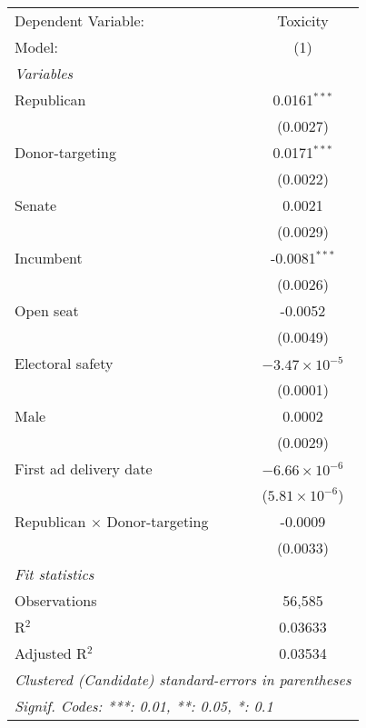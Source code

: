 
\begingroup
\centering
\begin{tabular}{lc}
   \tabularnewline \midrule \midrule
   Dependent Variable:                  & Toxicity\\  
   Model:                               & (1)\\  
   \midrule
   \emph{Variables}\\
   Republican                           & 0.0161$^{***}$\\   
                                        & (0.0027)\\   
   Donor-targeting                      & 0.0171$^{***}$\\   
                                        & (0.0022)\\   
   Senate                               & 0.0021\\   
                                        & (0.0029)\\   
   Incumbent                            & -0.0081$^{***}$\\   
                                        & (0.0026)\\   
   Open seat                            & -0.0052\\   
                                        & (0.0049)\\   
   Electoral safety                     & $-3.47\times 10^{-5}$\\    
                                        & (0.0001)\\   
   Male                                 & 0.0002\\   
                                        & (0.0029)\\   
   First ad delivery date               & $-6.66\times 10^{-6}$\\    
                                        & ($5.81\times 10^{-6}$)\\    
   Republican $\times$ Donor-targeting  & -0.0009\\   
                                        & (0.0033)\\   
   \midrule
   \emph{Fit statistics}\\
   Observations                         & 56,585\\  
   R$^2$                                & 0.03633\\  
   Adjusted R$^2$                       & 0.03534\\  
   \midrule \midrule
   \multicolumn{2}{l}{\emph{Clustered (Candidate) standard-errors in parentheses}}\\
   \multicolumn{2}{l}{\emph{Signif. Codes: ***: 0.01, **: 0.05, *: 0.1}}\\
\end{tabular}
\par\endgroup


